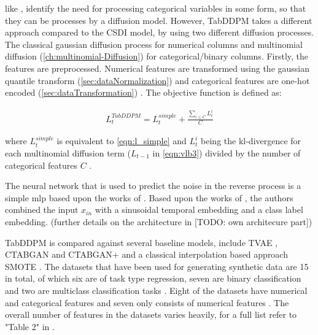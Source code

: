 \cite{kotelnikov2022TabDDPMModellingTabular} like \cite{zheng2022DiffusionModelsMissing}, identify the need for processing categorical variables in some form, so that they can be processes by a diffusion model.
However, TabDDPM takes a different approach compared to the CSDI model, by using two different diffusion processes.
The classical gaussian diffusion process \cite{ho2020DenoisingDiffusionProbabilistic} for numerical columns and multinomial diffusion \cite{hoogeboom2021ArgmaxFlowsMultinomial}(\autoref{ch:multinomial-Diffusion}) for categorical/binary columns\cite{zheng2022DiffusionModelsMissing}.
Firstly, the features are preprocessed.
Numerical features are transformed using the gaussian quantile transform (\autoref{sec:dataNormalization}) and categorical features are one-hot encoded (\autoref{sec:dataTransformation}) \cite{kotelnikov2022TabDDPMModellingTabular}.
The objective function is defined as:

\begin{equation}
    \label{eqn:tabddpm_loss}
    \begin{align*}
        L^{TabDDPM}_{t} =L^{simple}_t + \frac{\sum_{i \leq C}^{}L^i_{t}}{C}
    \end{align*}
\end{equation}

where $L^{simple}_t$ is equivalent to \autoref{eqn:l_simple} and $L^i_{t}$ being the \gls{kl}-divergence for each multinomial diffusion term ($L_{t-1}$ in \autoref{eqn:vlb3}) divided by the number of categorical features $C$ \cite{kotelnikov2022TabDDPMModellingTabular}.

The neural network that is used to predict the noise in the reverse process is a simple \gls{mlp} based upon the works of \cite{gorishniy2021RevisitingDeepLearning}.
Based upon the works of \cite{nichol2021ImprovedDenoisingDiffusion, dhariwal2021DiffusionModelsBeat}, the authors combined the input $x_{in}$ with a sinusoidal temporal embedding and a class label embedding.
(further details on the architecture in [TODO: own architecure part])

TabDDPM is compared against several baseline models, include TVAE \cite{xu2019ModelingTabularData}, CTABGAN \cite{zhao2021CTABGANEffectiveTablea} and CTABGAN+ \cite{zhao2022CTABGANEnhancingTabular}
and a classical interpolation based approach SMOTE \cite{chawla2002SMOTESyntheticMinority}.
The datasets that have been used for generating synthetic data are 15 in total, of which six are of task type regression, seven are binary classification and two are multiclass classification tasks \cite{kotelnikov2022TabDDPMModellingTabular}.
Eight of the datasets have numerical and categorical features and seven only consists of numerical features \cite{kotelnikov2022TabDDPMModellingTabular}.
The overall number of features in the datasets varies heavily, for a full list refer to "Table 2" in \cite[p. 5]{kotelnikov2022TabDDPMModellingTabular}.

